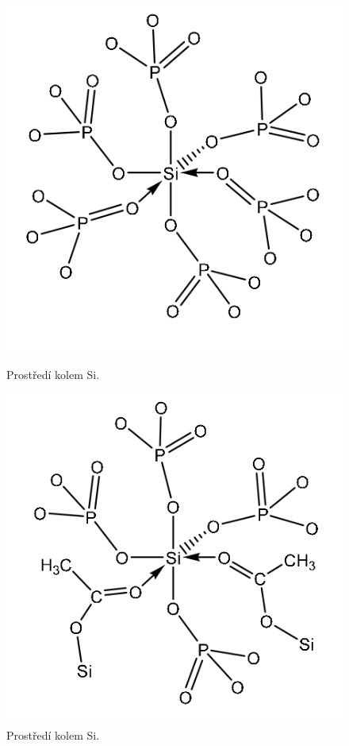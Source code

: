 \documentclass[
  digital, %
  table,   %
  lof,     %
  lot,     %
]{fithesis3}
\begin{document}
\begin{otherlanguage}{czech}
\begin{figure}
\centering
\begin{minipage}{.45\linewidth}
  \includegraphics[width=\linewidth]{si_koordinovane_6_P.png}
  \caption{Prostředí kolem Si. \cite{Styskalik2015thesis}}
  \label{img1}
\end{minipage}
\hspace{.05\linewidth}
\begin{minipage}{.45\linewidth}
  \includegraphics[width=\linewidth]{si_koordinovany_6_C.png}
  \caption{Prostředí kolem Si. \cite{Styskalik2015thesis}}
  \label{img2}
\end{minipage}
\end{figure}


\end{otherlanguage}
\end{document}
